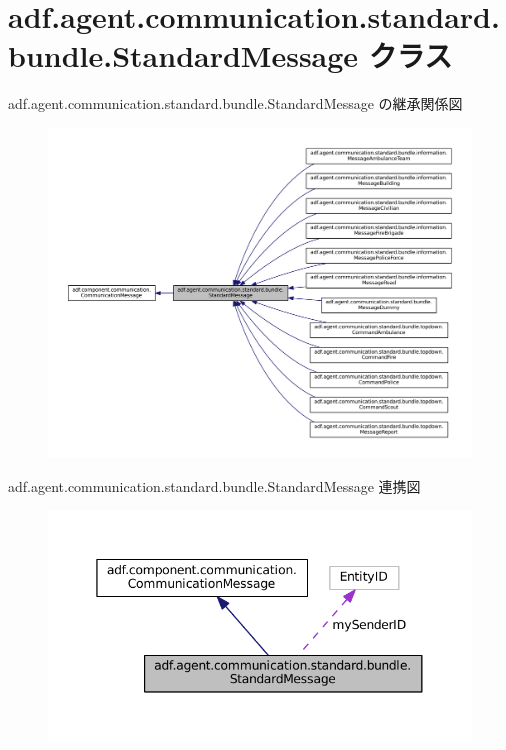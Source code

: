 \hypertarget{classadf_1_1agent_1_1communication_1_1standard_1_1bundle_1_1StandardMessage}{}\section{adf.\+agent.\+communication.\+standard.\+bundle.\+Standard\+Message クラス}
\label{classadf_1_1agent_1_1communication_1_1standard_1_1bundle_1_1StandardMessage}


adf.\+agent.\+communication.\+standard.\+bundle.\+Standard\+Message の継承関係図
\nopagebreak
\begin{figure}[H]
\begin{center}
\leavevmode
\includegraphics[width=350pt]{classadf_1_1agent_1_1communication_1_1standard_1_1bundle_1_1StandardMessage__inherit__graph}
\end{center}
\end{figure}


adf.\+agent.\+communication.\+standard.\+bundle.\+Standard\+Message 連携図
\nopagebreak
\begin{figure}[H]
\begin{center}
\leavevmode
\includegraphics[width=345pt]{classadf_1_1agent_1_1communication_1_1standard_1_1bundle_1_1StandardMessage__coll__graph}
\end{center}
\end{figure}
